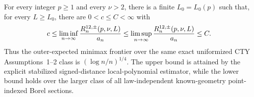 For every integer \(p\geq1\) and every \(\nu>2\), there is a finite \(L_0=L_0(p)\) such that, for every \(L\geq L_0\), there are \(0<c\leq C<\infty\) with
\[
 c\leq\liminf_{n\to\infty}{R^{12,\pm}_n(p,\nu,L)\over a_n}
 \leq\limsup_{n\to\infty}{R^{12,\pm}_n(p,\nu,L)\over a_n}\leq C.
\]
Thus the outer-expected minimax frontier over the same exact uniformized CTY Assumptions~1--2 class is \((\log n/n)^{1/4}\).  The upper bound is attained by the explicit stabilized signed-distance local-polynomial estimator, while the lower bound holds over the larger class of all law-independent known-geometry point-indexed Borel sections.